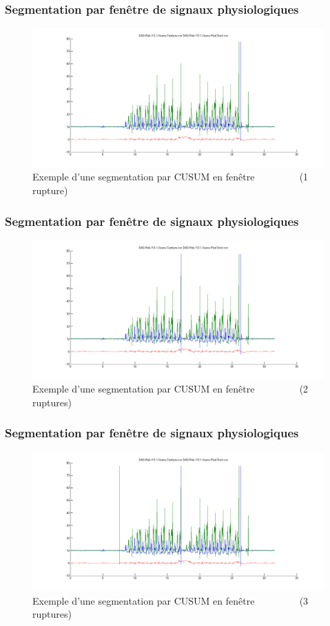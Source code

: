 \documentclass{beamer}
\begin{document}
\begin{frame}
	\frametitle{Segmentation par fenêtre de signaux physiologiques}
	\begin{figure}
		\includegraphics[scale=0.3]{seg1_win.png}
		\caption{Exemple d'une segmentation par CUSUM en fenêtre 
		~~~~~~~~
		(1 rupture)}
	\end{figure}
\end{frame}

\begin{frame}
	\frametitle{Segmentation par fenêtre de signaux physiologiques}
	\begin{figure}
		\includegraphics[scale=0.3]{seg2_win.png}
		\caption{Exemple d'une segmentation par CUSUM en fenêtre
		~~~~~~~~
		(2 ruptures)}
	\end{figure}
\end{frame}

\begin{frame}
	\frametitle{Segmentation par fenêtre de signaux physiologiques}
	\begin{figure}
		\includegraphics[scale=0.3]{seg3_win.png}
		\caption{Exemple d'une segmentation par CUSUM en fenêtre
		~~~~~~~~
		(3 ruptures)}
	\end{figure}
\end{frame}
\end{document}
